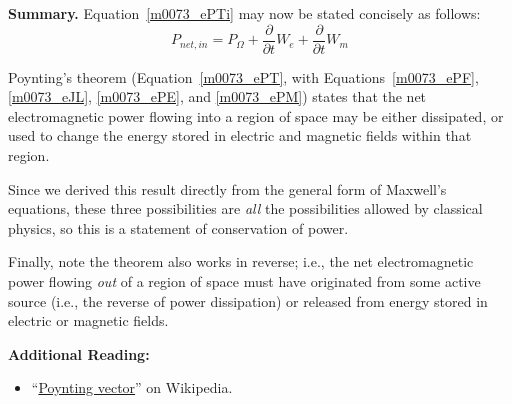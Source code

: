 {\bf Summary.}  Equation~\ref{m0073_ePTi} may now be stated concisely as follows:  
%
\begin{equation}
\boxed{
P_{net,in} = P_{\Omega} + \frac{\partial}{\partial t}W_e + \frac{\partial}{\partial t}W_m
}
\label{m0073_ePT}
\end{equation}
%
\begin{mdframed}[backgroundcolor=yellow!20,nobreak=true] 
Poynting's theorem (Equation~\ref{m0073_ePT}, with Equations~\ref{m0073_ePF}, \ref{m0073_eJL}, \ref{m0073_ePE}, and \ref{m0073_ePM})
states that the net electromagnetic power flowing into a region of space may be either dissipated, or used to change the energy stored in electric and magnetic fields within that region.  
\end{mdframed}
%
Since we derived this result directly from the general form of Maxwell's equations, these three possibilities are \emph{all} the possibilities allowed by classical physics, so this is a statement of conservation of power.  

Finally, note the theorem also works in reverse; i.e., the net electromagnetic power flowing \emph{out} of a region of space must have originated from some active source (i.e., the reverse of power dissipation) or released from energy stored in electric or magnetic fields. 


{\bf Additional Reading:}
\begin{itemize}
\item ``\href{https://en.wikipedia.org/wiki/Poynting_vector}{Poynting vector}'' on Wikipedia.
\end{itemize}

